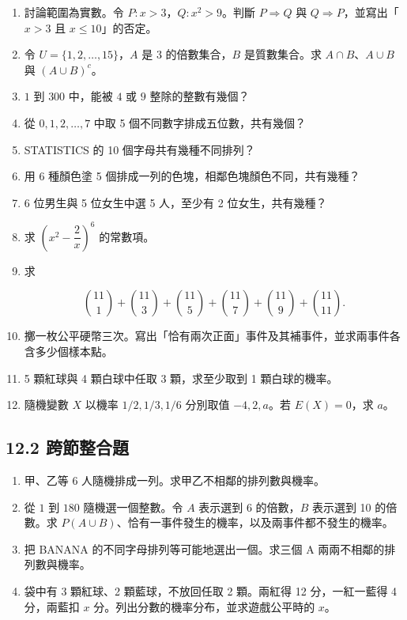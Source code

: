 \documentclass[11pt,a4paper]{article}
\providecommand{\tightlist}{%
  \setlength{\itemsep}{0pt}\setlength{\parskip}{0pt}}
\begin{document}
\begin{enumerate}
\def\labelenumi{\arabic{enumi}.}
\item
  討論範圍為實數。令 \(P:x>3\)，\(Q:x^2>9\)。判斷 \(P\Rightarrow Q\) 與 \(Q\Rightarrow P\)，並寫出「\(x>3\) 且 \(x\le10\)」的否定。
\item
  令 \(U=\{1,2,\ldots,15\}\)，\(A\) 是 3 的倍數集合，\(B\) 是質數集合。求 \(A\cap B\)、\(A\cup B\) 與 \((A\cup B)^c\)。
\item
  \(1\) 到 \(300\) 中，能被 \(4\) 或 \(9\) 整除的整數有幾個？
\item
  從 \(0,1,2,\ldots,7\) 中取 5 個不同數字排成五位數，共有幾個？
\item
  STATISTICS 的 10 個字母共有幾種不同排列？
\item
  用 6 種顏色塗 5 個排成一列的色塊，相鄰色塊顏色不同，共有幾種？
\item
  6 位男生與 5 位女生中選 5 人，至少有 2 位女生，共有幾種？
\item
  求 \(\left(x^2-\dfrac2x\right)^6\) 的常數項。
\item
  求

  \[
  \binom{11}{1}+\binom{11}{3}+\binom{11}{5}+\binom{11}{7}+\binom{11}{9}+\binom{11}{11}.
  \]
\item
  擲一枚公平硬幣三次。寫出「恰有兩次正面」事件及其補事件，並求兩事件各含多少個樣本點。
\item
  5 顆紅球與 4 顆白球中任取 3 顆，求至少取到 1 顆白球的機率。
\item
  隨機變數 \(X\) 以機率 \(1/2,1/3,1/6\) 分別取值 \(-4,2,a\)。若 \(E(X)=0\)，求 \(a\)。
\end{enumerate}

\subsection{12.2 跨節整合題}\label{ux8de8ux7bc0ux6574ux5408ux984c}

\begin{enumerate}
\def\labelenumi{\arabic{enumi}.}
\setcounter{enumi}{12}
\tightlist
\item
  甲、乙等 6 人隨機排成一列。求甲乙不相鄰的排列數與機率。
\item
  從 \(1\) 到 \(180\) 隨機選一個整數。令 \(A\) 表示選到 6 的倍數，\(B\) 表示選到 10 的倍數。求 \(P(A\cup B)\)、恰有一事件發生的機率，以及兩事件都不發生的機率。
\item
  把 BANANA 的不同字母排列等可能地選出一個。求三個 A 兩兩不相鄰的排列數與機率。
\item
  袋中有 3 顆紅球、2 顆藍球，不放回任取 2 顆。兩紅得 12 分，一紅一藍得 4 分，兩藍扣 \(x\) 分。列出分數的機率分布，並求遊戲公平時的 \(x\)。
\end{enumerate}
\end{document}
